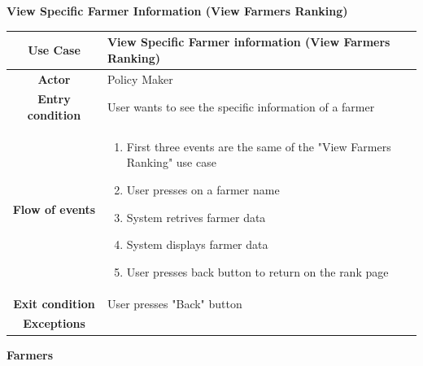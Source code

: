 \documentclass[table, 12pt]{article}
\begin{document}
\begin{itemize}
            \begin{table}[H]
                \item[] \textbf{View Specific Farmer Information (View Farmers Ranking)}
                \item[] 
                \centering
                \begin{tabular}{|c| m{}|}
                    \hline
                    \textbf{Use Case} & View Specific Farmer information (View Farmers Ranking)\\ \hline
                    \textbf{Actor} & Policy Maker\\ \hline
                    \textbf{Entry condition} & User wants to see the specific information of a farmer\\  \hline
                    \textbf{Flow of events} & \begin{enumerate}
                                                \item First three events are the same of the "View Farmers Ranking" use case 
                                                \item User presses on a farmer name
                                                \item System retrives farmer data 
                                                \item System displays farmer data
                                                \item User presses back button to return on the rank page
                                            \end{enumerate}\\ \hline
                    \textbf{Exit condition} & User presses "Back" button\\ \hline
                    \textbf{Exceptions} &  \\ \hline                    
                \end{tabular}
            \end{table}
            
            \newpage


            \item \textbf {Farmers}
            

\end{itemize}
\end{document}
